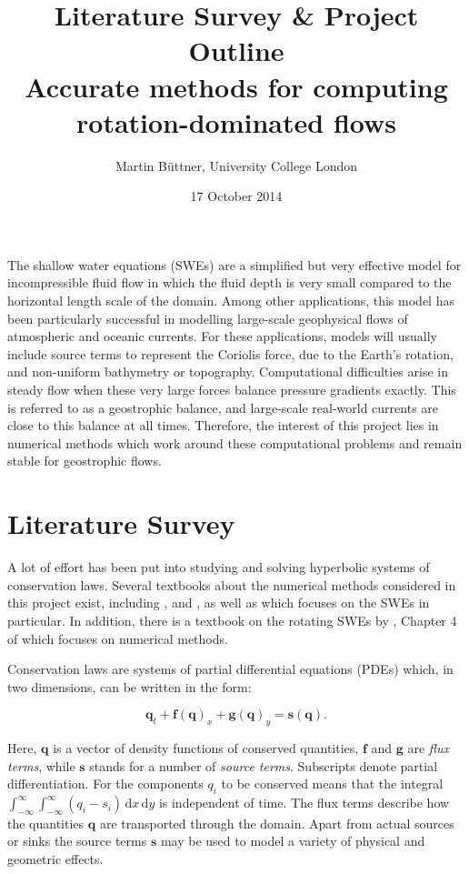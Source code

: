\documentclass[a4paper,onecolumn,11pt]{article}
\title{Literature Survey \& Project Outline\\\small Accurate methods for computing rotation-dominated flows}
\author{Martin Büttner, University College London}
\date{17 October 2014}
\renewcommand{\vec}[1]{\ensuremath{\mathbf{#1}}}
\newcommand{\dif}{\mathrm{d}}
\begin{document}
\maketitle

The shallow water equations (SWEs) are a simplified but very effective model for incompressible fluid flow in which the fluid depth is very small compared to the horizontal length scale of the domain. Among other applications, this model has been particularly successful in modelling large-scale geophysical flows of atmospheric and oceanic currents. For these applications, models will usually include source terms to represent the Coriolis force, due to the Earth's rotation, and non-uniform bathymetry or topography. Computational difficulties arise in steady flow when these very large forces balance pressure gradients exactly. This is referred to as a geostrophic balance, and large-scale real-world currents are close to this balance at all times. Therefore, the interest of this project lies in numerical methods which work around these computational problems and remain stable for geostrophic flows.

\section*{Literature Survey}

A lot of effort has been put into studying and solving hyperbolic systems of conservation laws. Several textbooks about the numerical methods considered in this project exist, including \citet{leveque1992numerical}, \citet{toro1999riemann} and \citet{leveque2002finite}, as well as \citet{toro2001shock} which focuses on the SWEs in particular. In addition, there is a textbook on the rotating SWEs by \citet{zeitlin2007nonlinear}, Chapter 4 of which focuses on numerical methods.

Conservation laws are systems of partial differential equations (PDEs) which, in two dimensions, can be written in the form:

\begin{equation}
    \vec{q}_t + \vec{f}(\vec{q})_x + \vec{g}(\vec{q})_y = \vec{s}(\vec{q}).
    \label{claw}
\end{equation}

Here, $\vec{q}$ is a vector of density functions of conserved quantities, $\vec{f}$ and $\vec{g}$ are \emph{flux terms}, while $\vec{s}$ stands for a number of \emph{source terms}. Subscripts denote partial differentiation. For the components $q_i$ to be conserved means that the integral $\int_{-\infty}^\infty\int_{-\infty}^\infty (q_i - s_i)\,\dif x\,\dif y$ is independent of time. The flux terms describe how the quantities $\vec{q}$ are transported through the domain. Apart from actual sources or sinks the source terms $\vec{s}$ may be used to model a variety of physical and geometric effects.
\end{document}
